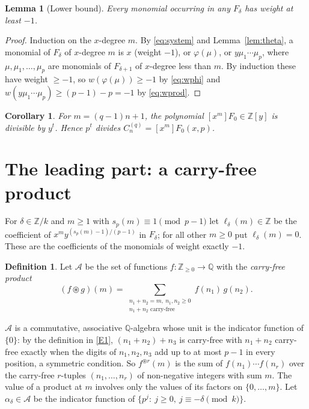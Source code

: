\documentclass[11pt]{article}
\newtheorem{lemma}[theorem]{Lemma}
\newtheorem{corollary}[theorem]{Corollary}
\theoremstyle{definition}
\newtheorem{definition}[theorem]{Definition}
\theoremstyle{remark}
\newcommand{\Z}{\mathbb Z}
\newcommand{\Q}{\mathbb Q}
\newcommand{\A}{\mathcal A}
\newcommand{\cf}{\circledast}
\newcommand{\C}{C_n^{(q)}}
\begin{document}
\begin{lemma}[Lower bound]\label{lem:lower}
Every monomial occurring in any $F_\delta$ has weight at least $-1$.
\end{lemma}

\begin{proof}
Induction on the $x$-degree $m$. By \eqref{eq:system} and Lemma~\ref{lem:theta}, a monomial of
$F_\delta$ of $x$-degree $m$ is $x$ (weight $-1$), or $\varphi(\mu)$, or $y\mu_1\cdots\mu_p$,
where $\mu,\mu_1,\dots,\mu_p$ are monomials of $F_{\delta+1}$ of $x$-degree less than $m$. By
induction these have weight $\ge-1$, so $w(\varphi(\mu))\ge-1$ by \eqref{eq:wphi} and
$w(y\mu_1\cdots\mu_p)\ge(p-1)-p=-1$ by \eqref{eq:wprod}.
\end{proof}

\begin{corollary}\label{cor:div}
For $m=(q-1)n+1$, the polynomial $[x^m]F_0\in\Z[y]$ is divisible by $y^t$. Hence $p^t$
divides $\C=[x^m]F_0(x,p)$.
\end{corollary}

\section{The leading part: a carry-free product}

For $\delta\in\Z/k$ and $m\ge1$ with $s_p(m)\equiv1\pmod{p-1}$ let $\ell_\delta(m)\in\Z$ be
the coefficient of $x^my^{(s_p(m)-1)/(p-1)}$ in $F_\delta$; for all other $m\ge0$ put
$\ell_\delta(m)=0$. These are the coefficients of the monomials of weight exactly $-1$.

\begin{definition}
Let $\A$ be the set of functions $f\colon\Z_{\ge0}\to\Q$ with the \emph{carry-free product}
\[
 (f\cf g)(m)=\sum_{\substack{n_1+n_2=m,\ n_1,n_2\ge0\\ n_1+n_2\text{ carry-free}}}f(n_1)\,g(n_2).
\]
\end{definition}

$\A$ is a commutative, associative $\Q$-algebra whose unit is the indicator function of
$\{0\}$: by the definition in \ref{E1}, $(n_1+n_2)+n_3$ is carry-free with $n_1+n_2$
carry-free exactly when the digits of $n_1,n_2,n_3$ add up to at most $p-1$ in every
position, a symmetric condition. So $f^{\cf r}(m)$ is the sum of $f(n_1)\cdots f(n_r)$ over
the carry-free $r$-tuples $(n_1,\dots,n_r)$ of non-negative integers with sum $m$. The value
of a product at $m$ involves only the values of its factors on $\{0,\dots,m\}$. Let
$\alpha_\delta\in\A$ be the indicator function of $\{p^j:\ j\ge0,\ j\equiv-\delta\pmod k\}$.
\end{document}
